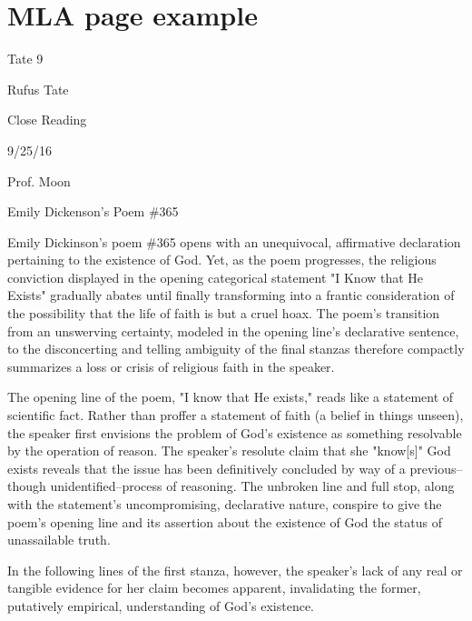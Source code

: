 \newpage
\section{MLA page example}

\bigskip

\begin{tcolorbox}[enhanced,width=4.2in,left=.3in, right=.3in,
   drop fuzzy shadow southeast,
    boxrule=0.4pt,sharp corners,colframe=black!80!black,colback=white!10]

\medskip

{\scriptsize \begin{flushright} Tate 9 \end{flushright}
\begin{doublespacing}
Rufus Tate

Close Reading

9/25/16

Prof. Moon

\begin{center}Emily Dickenson's Poem \#365 \end{center}
\hspace{1.4em} Emily Dickinson's poem \#365 opens with an unequivocal, affirmative declaration pertaining to the existence of God.  Yet, as the poem progresses, the religious conviction displayed in the opening categorical statement "I Know that He Exists" gradually abates until finally transforming into a frantic consideration of the possibility that the life of faith is but a cruel hoax.  The poem's transition from an unswerving certainty, modeled in the opening line's declarative sentence, to the disconcerting and telling ambiguity of the final stanzas therefore compactly summarizes a loss or crisis of religious faith in the speaker.  
  
\hspace{1.4em} The opening line of the poem, "I know that He exists," reads like a statement of scientific fact.  Rather than proffer a statement of faith (a belief in things unseen), the speaker first envisions the problem of God's existence as something resolvable by the operation of reason.  The speaker's resolute claim that she "know[s]" God exists reveals that the issue has been definitively concluded by way of a previous--though unidentified--process of  reasoning.  The unbroken line and full stop, along with the statement's uncompromising, declarative nature, conspire to give the poem's opening line and its assertion about the existence of God the status of unassailable truth.  

\hspace{1.4em}In the following lines of the first stanza, however, the speaker's lack of any real or tangible evidence for her claim becomes apparent, invalidating the former, putatively empirical, understanding of God's existence.  

\end{doublespacing}}
\bigskip


\end{tcolorbox}

